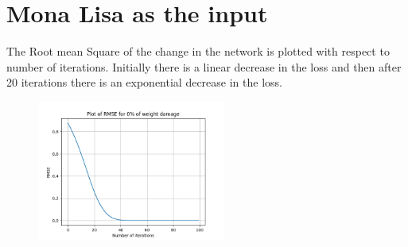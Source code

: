\documentclass{article}
\begin{document}
\section{Mona Lisa as the input}
\begin{figure}[H]
\hspace{0.001\textwidth}
\end{figure}


The Root mean Square of the change in the network is plotted with respect to number of iterations. Initially there is a linear decrease in the loss and then after 20 iterations there is an exponential decrease in the loss.
\begin{figure}[H]
\includegraphics[width=0.55\textwidth]{Mona_loss.png}
\centering
\end{figure}
\end{document}
